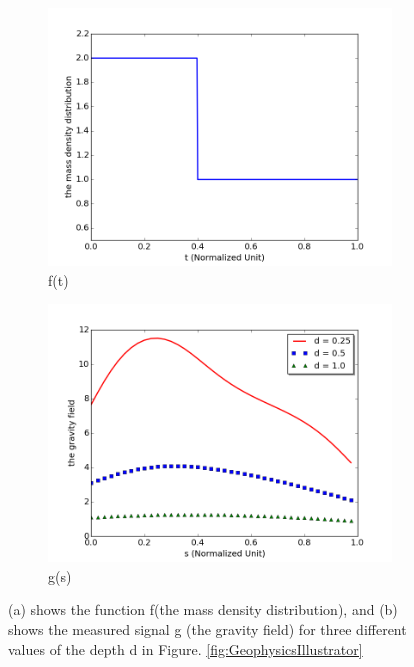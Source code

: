 \documentclass{article}
\begin{document}
\begin{figure}
	\centering
		\begin{subfigure}[b]{0.7\textwidth}
			\includegraphics[width=\textwidth]{images/FexactPlot/fexactplot}
			\caption{f(t)}
			\label{fig:f(t)}
		\end{subfigure}
		\begin{subfigure}[b]{0.7\textwidth}
			\includegraphics[width=\textwidth]{images/GexactPlot/gexactplot}
			\caption{g(s)}
			\label{fig:g(s)}
		\end{subfigure}
		\caption{(a) shows the function f(the mass density
		distribution), and (b) shows the measured signal g (the
		gravity field) for three different values of the depth d in Figure.
		\ref{fig:GeophysicsIllustrator}}\label{fig:geoexact}
\end{figure}
\end{document}
